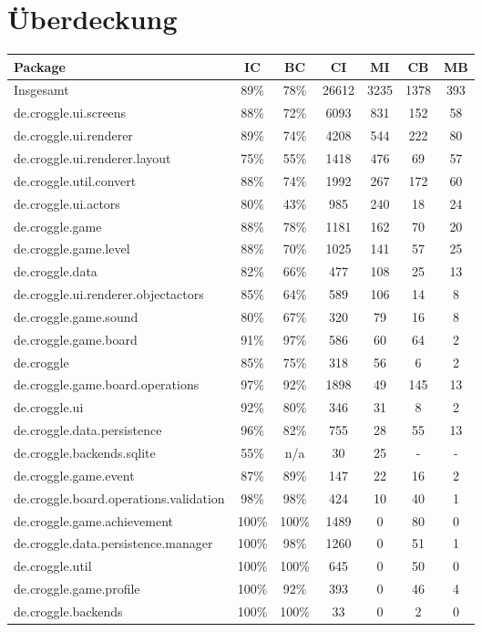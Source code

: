\chapter{Überdeckung}



\begin{center}
	\begin{tabular}{ | l | c | c | c | c | c | c |}
	\hline
	Package & IC & BC & CI & MI & CB & MB \\ \hline \hline
	Insgesamt & 89\% & 78\% & 26612 & 3235 & 1378 & 393 \\ \hline
	de.croggle.ui.screens & 88\% & 72\% & 6093 & 831 & 152 & 58 \\ \hline 
	de.croggle.ui.renderer & 89\% & 74\% & 4208 & 544 & 222 & 80 \\ \hline
	de.croggle.ui.renderer.layout & 75\% & 55\% & 1418 & 476 & 69 & 57 \\ \hline
	de.croggle.util.convert & 88\% & 74\% & 1992 & 267 & 172 & 60  \\ \hline
	de.croggle.ui.actors & 80\% & 43\% & 985 & 240 & 18 & 24 \\ \hline
	de.croggle.game & 88\% & 78\% & 1181 & 162 & 70 & 20\\ \hline
	de.croggle.game.level & 88\% & 70\% & 1025 & 141 & 57 & 25 \\ \hline
	de.croggle.data & 82\% & 66\% & 477 & 108 & 25 & 13\\ \hline
	de.croggle.ui.renderer.objectactors & 85\% & 64\% & 589 & 106 & 14 & 8 \\ \hline
	de.croggle.game.sound & 80\% & 67\% & 320 & 79 & 16 & 8 \\ \hline
	de.croggle.game.board & 91\% & 97\% & 586 & 60 & 64 & 2\\ \hline
	de.croggle & 85\% & 75\% & 318 & 56 & 6 & 2  \\ \hline
	de.croggle.game.board.operations & 97\% & 92\% & 1898 & 49 & 145 & 13 \\ \hline
	de.croggle.ui & 92\% & 80\% & 346 & 31 & 8 & 2 \\ \hline
	de.croggle.data.persistence & 96\% & 82\% & 755 & 28 & 55 & 13 \\ \hline
	de.croggle.backends.sqlite & 55\% & n/a & 30 & 25 & - & - \\ \hline
	de.croggle.game.event & 87\% & 89\% & 147 & 22 & 16 & 2 \\ \hline
	de.croggle.board.operations.validation & 98\% & 98\% & 424 & 10 & 40 & 1 \\ \hline
	de.croggle.game.achievement & 100\% & 100\% & 1489 & 0 & 80 & 0 \\ \hline
	de.croggle.data.persistence.manager & 100\% & 98\% & 1260 & 0 & 51 & 1 \\ \hline
	de.croggle.util & 100\% & 100\% & 645 & 0 & 50 & 0 \\ \hline
	de.croggle.game.profile & 100\% & 92\% & 393 & 0 & 46 & 4  \\ \hline
	de.croggle.backends & 100\% & 100\% & 33 & 0 & 2 & 0 \\ \hline
    \end{tabular}
\end{center}


